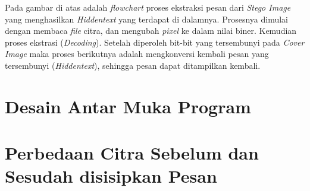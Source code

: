 	Pada gambar di atas adalah \emph{flowchart} proses ekstraksi pesan dari \emph{Stego Image} yang menghasilkan \emph{Hiddentext} yang terdapat di dalamnya. Prosesnya dimulai dengan
	membaca \emph{file} citra, dan mengubah \emph{pixel} ke dalam nilai biner.
	Kemudian proses ekstrasi (\emph{Decoding}). Setelah diperoleh bit-bit yang tersembunyi pada \emph{Cover Image} maka proses
	berikutnya adalah mengkonversi kembali pesan yang tersembunyi (\emph{Hiddentext}), sehingga pesan dapat ditampilkan kembali.
	
\section{Desain Antar Muka Program}
\section{Perbedaan Citra Sebelum dan Sesudah disisipkan Pesan}
